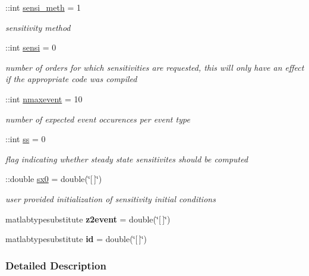 \begin{DoxyCompactItemize}
\+::int \hyperlink{classamioption_ab31e219eb42bc06629c3f247a01b9906}{sensi\+\_\+meth} = 1
\begin{DoxyCompactList}\small\item\em sensitivity method \end{DoxyCompactList}\item 
\+::int \hyperlink{classamioption_a7dd31d33463c5a709251bcef0eccaa36}{sensi} = 0
\begin{DoxyCompactList}\small\item\em number of orders for which sensitivities are requested, this will only have an effect if the appropriate code was compiled \end{DoxyCompactList}\item 
\+::int \hyperlink{classamioption_a85519d27e7231ac625e5b2deee92165a}{nmaxevent} = 10
\begin{DoxyCompactList}\small\item\em number of expected event occurences per event type \end{DoxyCompactList}\item 
\+::int \hyperlink{classamioption_a8f60c8102d29fcd525162d02eed4566b}{ss} = 0
\begin{DoxyCompactList}\small\item\em flag indicating whether steady state sensitivites should be computed \end{DoxyCompactList}\item 
\+::double \hyperlink{classamioption_ae40f9a7172d3a41725c151afaec347f7}{sx0} = double(\char`\"{}\mbox{[}$\,$\mbox{]}\char`\"{})
\begin{DoxyCompactList}\small\item\em user provided initialization of sensitivity initial conditions \end{DoxyCompactList}\item 
\hypertarget{classamioption_aaa61f948de07e22bb723bac762c6bc55}{}matlabtypesubstitute {\bfseries z2event} = double(\char`\"{}\mbox{[}$\,$\mbox{]}\char`\"{})\label{classamioption_aaa61f948de07e22bb723bac762c6bc55}

\item 
\hypertarget{classamioption_a7caebe2c1b0190ba06b132e00dacfefd}{}matlabtypesubstitute {\bfseries id} = double(\char`\"{}\mbox{[}$\,$\mbox{]}\char`\"{})\label{classamioption_a7caebe2c1b0190ba06b132e00dacfefd}

\end{DoxyCompactItemize}


\subsubsection{Detailed Description}


